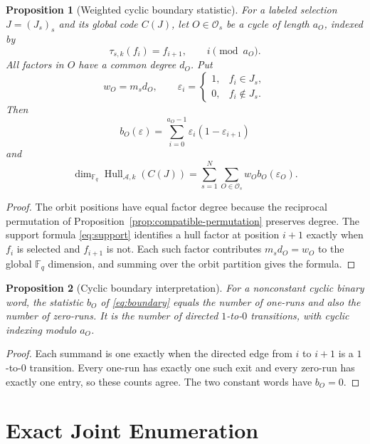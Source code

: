 \documentclass[11pt]{article}
\newcommand{\F}{\mathbb F}
\newcommand{\A}{\mathcal A}
\newcommand{\Os}{\mathcal O_s}
\newcommand{\Hull}{\operatorname{Hull}}
\theoremstyle{plain}
\newtheorem{proposition}{Proposition}
\theoremstyle{definition}
\theoremstyle{remark}
\begin{document}
\begin{proposition}[Weighted cyclic boundary statistic]\label{prop:boundary}
For a labeled selection $J=(J_s)_s$ and its global code $C(J)$, let $O\in\Os$ be a cycle of length $a_O$, indexed by
\[
\tau_{s,k}(f_i)=f_{i+1},\qquad i\pmod {a_O}.
\]
All factors in $O$ have a common degree $d_O$. Put
\[
w_O=m_s d_O,
\qquad
\varepsilon_i=\begin{cases}1,&f_i\in J_s,\\0,&f_i\notin J_s.\end{cases}
\]
Then
\begin{equation}\label{eq:boundary}
b_O(\varepsilon)=\sum_{i=0}^{a_O-1}\varepsilon_i(1-\varepsilon_{i+1})
\end{equation}
and
\begin{equation}\label{eq:hull-dim}
\dim_{\F_q}\Hull_{\A,k}(C(J))
 =\sum_{s=1}^{N}\sum_{O\in\Os}w_O b_O(\varepsilon_O).
\end{equation}
\end{proposition}

\begin{proof}
The orbit positions have equal factor degree because the reciprocal permutation of Proposition~\ref{prop:compatible-permutation} preserves degree. The support formula \eqref{eq:support} identifies a hull factor at position $i+1$ exactly when $f_i$ is selected and $f_{i+1}$ is not. Each such factor contributes $m_s d_O=w_O$ to the global $\F_q$ dimension, and summing over the orbit partition gives the formula.
\end{proof}

\begin{proposition}[Cyclic boundary interpretation]\label{prop:boundary-interpretation}
For a nonconstant cyclic binary word, the statistic $b_O$ of \eqref{eq:boundary} equals the number of one-runs and also the number of zero-runs. It is the number of directed $1$-to-$0$ transitions, with cyclic indexing modulo $a_O$.
\end{proposition}

\begin{proof}
Each summand is one exactly when the directed edge from $i$ to $i+1$ is a $1$-to-$0$ transition. Every one-run has exactly one such exit and every zero-run has exactly one entry, so these counts agree. The two constant words have $b_O=0$.
\end{proof}

\section{Exact Joint Enumeration}\label{sec:enumeration}
\end{document}
